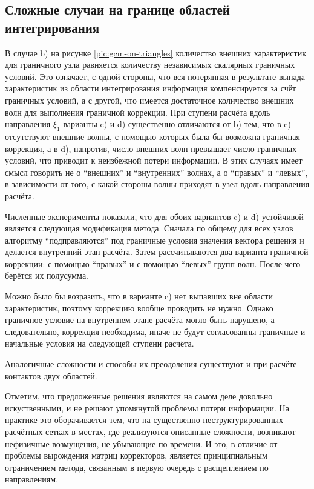\subsection{Сложные случаи на границе областей интегрирования}
\label{bad_border_cases}
В случае b) на рисунке \ref{pic:gcm-on-triangles} 
количество внешних характеристик для граничного узла равняется количеству независимых 
скалярных граничных условий. Это означает, с одной стороны, 
что вся потерянная в результате выпада характеристик из области интегрирования информация 
компенсируется за счёт граничных условий, а с другой, 
что имеется достаточное количество внешних волн для выполнения граничной коррекции. 
При ступени расчёта вдоль направления $\xi_1$ варианты c) и d) 
существенно отличаются от b) тем, что  
в c) отсутствуют внешние волны, с помощью которых была бы возможна граничная коррекция, 
а в d), напротив, число внешних волн превышает число граничных условий, что 
приводит к неизбежной потери информации. В этих случаях имеет смысл говорить не о 
``внешних'' и ``внутренних'' волнах, а о ``правых'' и ``левых'', в зависимости от 
того, с какой стороны волны приходят в узел вдоль направления расчёта.

Численные эксперименты показали, что для обоих вариантов c) и d) устойчивой является 
следующая модификация метода. 
Сначала по общему для всех узлов алгоритму ``подправляются'' под 
граничные условия значения вектора решения и делается внутренний этап расчёта. 
Затем рассчитываются два варианта граничной коррекции: с помощью ``правых'' и 
с помощью ``левых'' групп волн. После чего берётся их полусумма. 

Можно было бы возразить, что в варианте c) нет выпавших вне области характеристик, 
поэтому коррекцию вообще проводить не нужно. Однако граничное условие на внутреннем этапе расчёта 
могло быть нарушено, а следовательно, коррекция необходима, иначе не будут  
согласованны граничные и начальные условия на следующей ступени расчёта.

Аналогичные сложности и способы их преодоления существуют и при расчёте контактов двух областей. 

Отметим, что предложенные решения являются на самом деле довольно искуственными, 
и не решают упомянутой проблемы потери информации. На практике это оборачивается тем, 
что на существенно неструктурированных расчётных сетках в местах, где реализуются 
описанные сложности, возникают нефизичные возмущения, не убывающие по времени. 
И это, в отличие от проблемы вырождения матриц корректоров, является принципиальным 
ограничением метода, связанным в первую очередь с расщеплением по направлениям.

